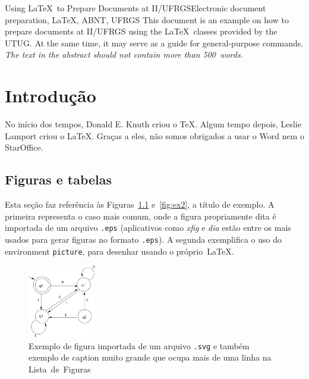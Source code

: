 \documentclass[nominatalocal,openright, diss]{iiufrgs}
\begin{document}
\begin{englishabstract}{Using \LaTeX\ to Prepare Documents at II/UFRGS}{Electronic document preparation, \LaTeX, ABNT, UFRGS}
This document is an example on how to prepare documents at II/UFRGS
using the \LaTeX\ classes provided by the UTUG\@. At the same time, it
may serve as a guide for general-purpose commands. \emph{The text in
the abstract should not contain more than 500~words.}
\end{englishabstract}


\chapter{Introdução}

No início dos tempos, Donald E. Knuth criou o \TeX. Algum tempo depois, Leslie Lamport criou o \LaTeX. Graças a eles, não somos obrigados a usar o Word nem o StarOffice.

\section{Figuras e tabelas}

Esta seção faz referência às Figuras~\ref{fig:ex1} e~\ref{fig:ex2}, a título de exemplo. A primeira representa o caso mais comum, onde a figura propriamente dita é importada de um arquivo \texttt{.eps} (aplicativos como \emph{xfig} e \emph{dia} estão entre os mais usados para gerar figuras no formato \texttt{.eps}). A segunda exemplifica o uso do environment \texttt{picture}, para desenhar usando o próprio~\LaTeX.


\begin{figure}
        \centerline{
            \includegraphics[width=8em]{fig.pdf}
        }
        \caption{Exemplo de figura importada de um arquivo \texttt{.svg} e também exemplo de caption muito grande que ocupa mais de uma linha na Lista~de~Figuras}
        \label{fig:ex1}
\end{figure}
\end{document}
